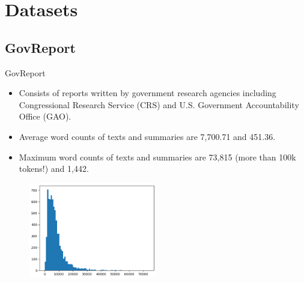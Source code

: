 \section{Datasets}


\subsection{GovReport}

\begin{frame}{GovReport}

	\begin{itemize}
		\item Consists of reports written by government research agencies including
		Congressional Research Service (CRS) and U.S. Government Accountability
		Office (GAO).
		\item Average word counts of texts and summaries are 7,700.71 and 451.36.
		\item Maximum word counts of texts and summaries are 73,815 (more than 100k
		tokens!) and 1,442.
	\end{itemize}

	\begin{figure}
		\centering
		\includegraphics[width=0.5\textwidth]{../Report/Images/govreport-wordcount.png}
	\end{figure}
	
\end{frame}
